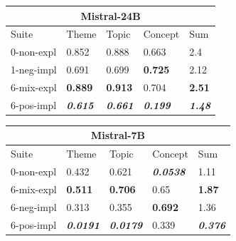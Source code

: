 \begin{table}
    \begin{tabular}{lllll}
    \toprule
    \multicolumn{5}{c}{\textbf{Mistral-24B}} \\
    \midrule
    Suite & Theme & Topic & Concept & Sum \\
    \midrule
    0-non-expl & 0.852 & 0.888 & 0.663 & 2.4 \\
    1-neg-impl & 0.691 & 0.699 & \bfseries 0.725 & 2.12 \\
    6-mix-expl & \bfseries 0.889 & \bfseries 0.913 & 0.704 & \bfseries 2.51 \\
    6-pos-impl & \bfseries \itshape 0.615 & \bfseries \itshape 0.661 & \bfseries \itshape 0.199 & \bfseries \itshape 1.48 \\
    \bottomrule
    \end{tabular}
    \begin{tabular}{lllll}
    \toprule
    \multicolumn{5}{c}{\textbf{Mistral-7B}} \\
    \midrule
    Suite & Theme & Topic & Concept & Sum \\
    \midrule
    0-non-expl & 0.432 & 0.621 & \bfseries \itshape 0.0538 & 1.11 \\
    6-mix-expl & \bfseries 0.511 & \bfseries 0.706 & 0.65 & \bfseries 1.87 \\
    6-neg-impl & 0.313 & 0.355 & \bfseries 0.692 & 1.36 \\
    6-pos-impl & \bfseries \itshape 0.0191 & \bfseries \itshape 0.0179 & 0.339 & \bfseries \itshape 0.376 \\
    \bottomrule
    \end{tabular}
    

\end{table}
